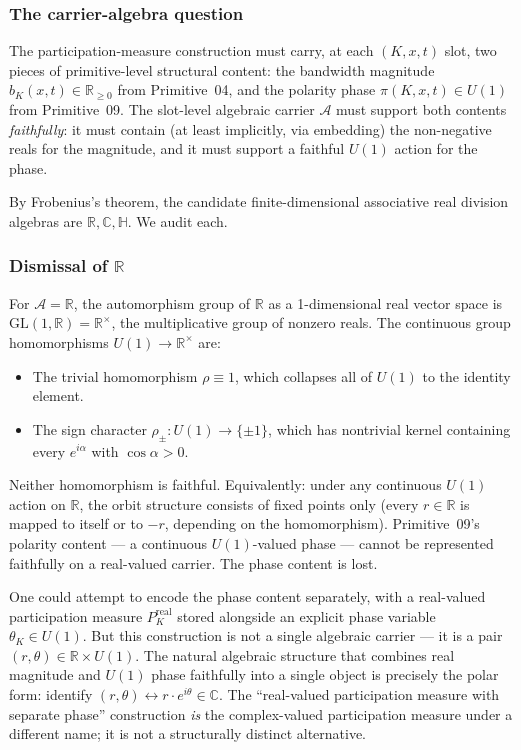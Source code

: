 \documentclass[11pt,a4paper]{article}
\begin{document}
\subsubsection{The carrier-algebra question}

The participation-measure construction must carry, at each $(K, x, t)$ slot, two pieces of primitive-level structural content: the bandwidth magnitude $b_K(x, t) \in \mathbb{R}_{\geq 0}$ from Primitive~04, and the polarity phase $\pi(K, x, t) \in U(1)$ from Primitive~09. The slot-level algebraic carrier $\mathcal{A}$ must support both contents \emph{faithfully}: it must contain (at least implicitly, via embedding) the non-negative reals for the magnitude, and it must support a faithful $U(1)$ action for the phase.

By Frobenius's theorem, the candidate finite-dimensional associative real division algebras are $\mathbb{R}, \mathbb{C}, \mathbb{H}$. We audit each.

\subsubsection{Dismissal of $\mathbb{R}$}\label{sec:F1-R}

For $\mathcal{A} = \mathbb{R}$, the automorphism group of $\mathbb{R}$ as a 1-dimensional real vector space is $\mathrm{GL}(1, \mathbb{R}) = \mathbb{R}^\times$, the multiplicative group of nonzero reals. The continuous group homomorphisms $U(1) \to \mathbb{R}^\times$ are:
\begin{itemize}
  \item The trivial homomorphism $\rho \equiv 1$, which collapses all of $U(1)$ to the identity element.
  \item The sign character $\rho_\pm : U(1) \to \{\pm 1\}$, which has nontrivial kernel containing every $e^{i \alpha}$ with $\cos \alpha > 0$.
\end{itemize}
Neither homomorphism is faithful. Equivalently: under any continuous $U(1)$ action on $\mathbb{R}$, the orbit structure consists of fixed points only (every $r \in \mathbb{R}$ is mapped to itself or to $-r$, depending on the homomorphism). Primitive~09's polarity content --- a continuous $U(1)$-valued phase --- cannot be represented faithfully on a real-valued carrier. The phase content is lost.

One could attempt to encode the phase content separately, with a real-valued participation measure $P_K^\mathrm{real}$ stored alongside an explicit phase variable $\theta_K \in U(1)$. But this construction is not a single algebraic carrier --- it is a pair $(r, \theta) \in \mathbb{R} \times U(1)$. The natural algebraic structure that combines real magnitude and $U(1)$ phase faithfully into a single object is precisely the polar form: identify $(r, \theta) \leftrightarrow r \cdot e^{i \theta} \in \mathbb{C}$. The ``real-valued participation measure with separate phase'' construction \emph{is} the complex-valued participation measure under a different name; it is not a structurally distinct alternative.
\end{document}
